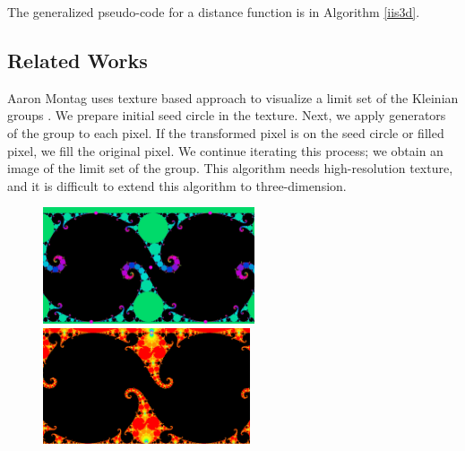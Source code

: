 The generalized pseudo-code for a distance function is in Algorithm \ref{iis3d}. 

\subsection{Related Works}

Aaron Montag uses texture based approach to visualize a limit set of the
Kleinian groups \cite{Montag2014hyperbolicIFS}.
We prepare initial seed circle in the texture.
Next, we apply generators of the group to each pixel.
If the transformed pixel is on the seed circle or filled pixel, we fill the original pixel.
We continue iterating this process; we obtain an image of the limit set of
the group.
This algorithm needs high-resolution texture, and it is difficult to
extend this algorithm to three-dimension.

\begin{figure}[htbp]
 \begin{minipage}[t]{0.5\hsize}
  \center
  \includegraphics[height=1.35in, keepaspectratio]{img/preparation/related/josklein.png}
  \caption{\textit{}}
  \label{fig:jos}
  \hspace*{\fill}
 \end{minipage}
 \begin{minipage}[t]{0.5\hsize}
  \center
  \includegraphics[height=1.35in, keepaspectratio]{img/preparation/related/joskleinInv.png}
  \caption{\textit{}}
  \label{fig:josInv}
  \hspace*{\fill}
 \end{minipage}
\end{figure}

